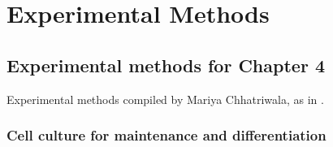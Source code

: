 

\chapter{Experimental Methods}

\section{Experimental methods for Chapter 4}
Experimental methods compiled by Mariya Chhatriwala, as in \cite{cuomo2020single}.

\subsection{Cell culture for maintenance and differentiation}

